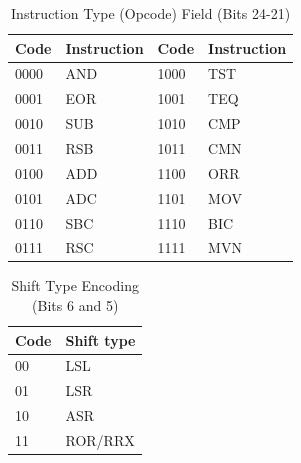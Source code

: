 \documentclass[../comorg-part1.tex]{subfiles}
\begin{document}
\begin{table}[H]
    \centering
    \caption*{Instruction Type (Opcode) Field (Bits 24-21)}
    \begin{tabular}{ll@{\qquad}ll}
        \toprule
        \textbf{Code} & \textbf{Instruction} & \textbf{Code} & \textbf{Instruction} \\
        \midrule
        0000 & AND & 1000 & TST \\
        0001 & EOR & 1001 & TEQ \\
        0010 & SUB & 1010 & CMP \\
        0011 & RSB & 1011 & CMN \\
        0100 & ADD & 1100 & ORR \\
        0101 & ADC & 1101 & MOV \\
        0110 & SBC & 1110 & BIC \\
        0111 & RSC & 1111 & MVN \\
        \bottomrule
    \end{tabular}
\end{table}

\begin{table}[H]
    \centering
    \caption*{Shift Type Encoding (Bits 6 and 5)}
    \begin{tabular}{ll}
        \toprule
        \textbf{Code} & \textbf{Shift type} \\
        \midrule
        00 & LSL \\
        01 & LSR \\
        10 & ASR \\
        11 & ROR/RRX \\
        \bottomrule
    \end{tabular}
\end{table}

\end{document}
